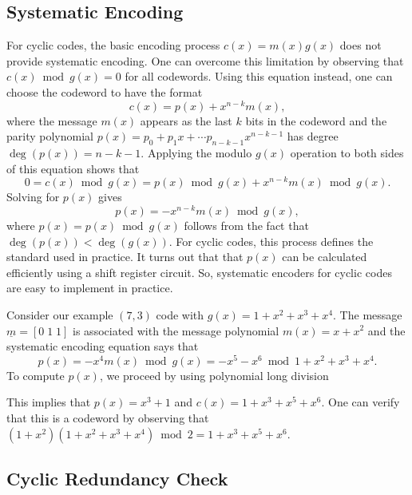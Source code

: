 \subsection{Systematic Encoding}

For cyclic codes, the basic encoding process $c(x)=m(x)g(x)$ does not provide systematic encoding.
One can overcome this limitation by observing that $c(x) \bmod g(x) = 0$ for all codewords.
Using this equation instead, one can choose the codeword to have the format
\[ c(x) = p(x) + x^{n-k} m(x), \]
where the message $m(x)$ appears as the last $k$ bits in the codeword and the parity polynomial $p(x)=p_0 + p_1 x + \cdots p_{n-k-1} x^{n-k-1}$ has degree $\deg\left( p(x)\right) = n-k-1$.
Applying the modulo $g(x)$ operation to both sides of this equation shows that
\[ 0 = c(x) \bmod g(x) = p(x) \bmod g(x) + x^{n-k} m(x) \bmod g(x). \]
Solving for $p(x)$ gives
\[ p(x) = - x^{n-k} m(x) \bmod g(x), \]
where $p(x) = p(x) \bmod g(x)$ follows from the fact that $\deg\left( p(x)\right) < \deg\left( g(x)\right)$.
For cyclic codes, this process defines the standard  used in practice.
It turns out that that  $p(x)$ can be calculated efficiently using a shift register circuit.
So, systematic encoders for cyclic codes are easy to implement in practice.

\begin{example}
Consider our example $(7,3)$ code with $g(x) = 1 + x^2 + x^3 + x^4$.
The message $\underline{m} = [0\;1\;1]$ is associated with the message polynomial $m(x) = x+x^2$ and the systematic encoding equation says that
\[ p(x) = - x^4 m(x) \bmod g(x) = -x^5 - x^6 \bmod 1+x^2 + x^3 + x^4. \]
To compute $p(x)$, we proceed by using polynomial long division
\begin{center}
\end{center}
This implies that $p(x) = x^3+1$ and $c(x) = 1+x^3 + x^5 + x^6$.
One can verify that this is a codeword by observing that $(1+x^2)(1+x^2+x^3+x^4)\bmod 2 = 1+x^3+x^5+x^6$.
\end{example}

\subsection{Cyclic Redundancy Check}

